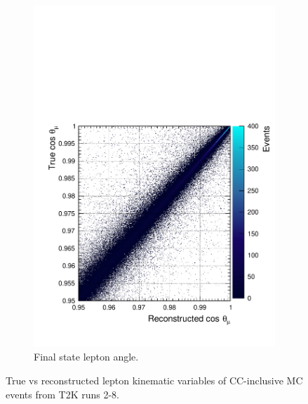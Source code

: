 \begin{figure}[t]
\begin{subfigure}{.5\textwidth}
  \includegraphics[width=0.95\linewidth]{figs/angres2d}
  \caption{Final state lepton angle.}
  \label{fig:angres2d}
\end{subfigure}
\caption{True vs reconstructed lepton kinematic variables of CC-inclusive MC events from T2K runs 2-8.}
\label{fig:res2d}
\end{figure}

